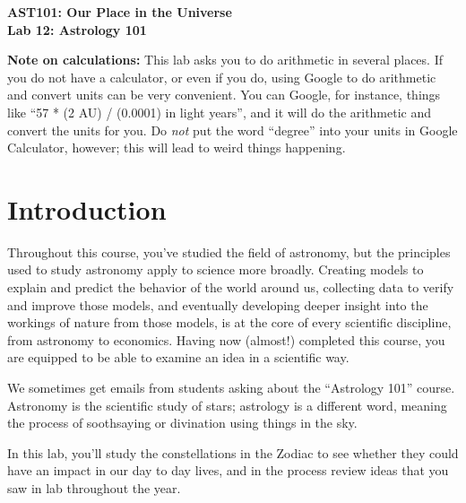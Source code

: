 \documentclass[11pt]{article}
\begin{document}
\begin{center}
\textbf{\Large
AST101: Our Place in the Universe \\
\vspace*{0.1cm}
Lab 12: Astrology 101
}
\vspace{1em}




\end{center}

{\bf Note on calculations:} This lab asks you to do arithmetic in several places. If you do not have a calculator, or even if you do, using Google to do arithmetic and convert units can be very convenient. You can Google, for instance, things like ``57 * (2 AU) / (0.0001) in light years'', and it will do the arithmetic and convert the units for you. Do {\it not} put the word ``degree'' into your units in Google Calculator, however; this will lead to weird things happening.

\vspace*{0.5cm}



\section{Introduction}

Throughout this course, you've studied the field of astronomy, but the principles used to study astronomy apply to science more broadly. Creating models to explain and predict the behavior of the world around us, collecting data to verify and improve those models, and eventually developing deeper insight into the workings of nature from those models, is at the core of every scientific discipline, from astronomy to economics. Having now (almost!) completed this course, you are equipped to be able to examine an idea in a scientific way. 

We sometimes get emails from students asking about the ``Astrology 101'' course. Astronomy is the scientific study of stars; astrology is a different word, meaning the process of soothsaying or divination using things in the sky.

In this lab, you'll study the constellations in the Zodiac to see whether they could have an impact in our day to day lives, and in the process review ideas that you saw in lab throughout the year. \\ \\ \\
\end{document}
